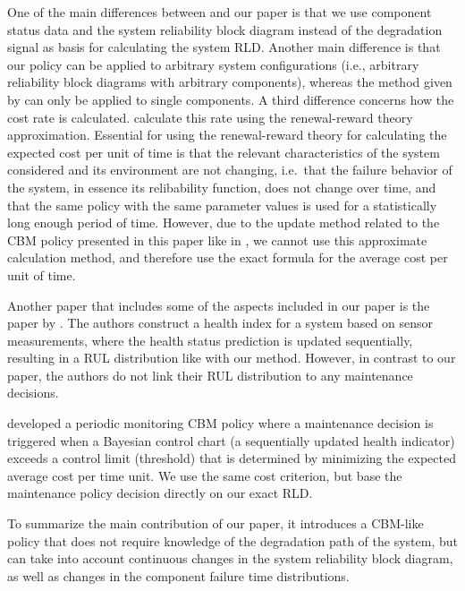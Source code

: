 \documentclass[authoryear]{elsarticle}
\begin{document}
One of the main differences between \citet{2013:si-et-al} and our paper
is that we use component status data and the system reliability block diagram instead of the degradation signal
as basis for calculating the system RLD.
Another main difference is that our policy can be applied to arbitrary system configurations
(i.e., arbitrary reliability block diagrams with arbitrary components),
whereas the method given by \citet{2013:si-et-al} can only be applied to single components.
A third difference concerns how the cost rate is calculated.
\citet{2013:si-et-al} calculate this rate using the renewal-reward theory approximation.
Essential for using the renewal-reward theory for calculating the expected cost per unit of time
is that the relevant characteristics of the system considered and its environment are not changing,
i.e.\ that the failure behavior of the system,
in essence its relibability function, does not change over time,
and that the same policy with the same parameter values is used for a statistically long enough period of time.
However, due to the update method related to the CBM policy presented in this paper
like in \citet{2013:si-et-al}, we cannot use this approximate calculation method,
and therefore use the exact formula for the average cost per unit of time.

Another paper that includes some of the aspects included in our paper is the paper by \citet{2012:sun-et-al}.
The authors construct a health index for a system based on sensor measurements,
where the health status prediction is updated sequentially,
resulting in a RUL distribution like with our method.
However, in contrast to our paper, the authors do not link their RUL distribution to any maintenance decisions.

\citet{2011:kim-et-al} developed a periodic monitoring CBM policy
where a maintenance decision is triggered when a Bayesian control chart
(a sequentially updated health indicator) exceeds a control limit (threshold)
that is determined by minimizing the expected average cost per time unit.
We use the same cost criterion, but base the maintenance policy decision directly on our exact RLD.

To summarize the main contribution of our paper,
it introduces a CBM-like policy that does not require knowledge of the degradation path of the system,
but can take into account continuous changes in the system reliability block diagram,
as well as changes in the component failure time distributions.
\end{document}
